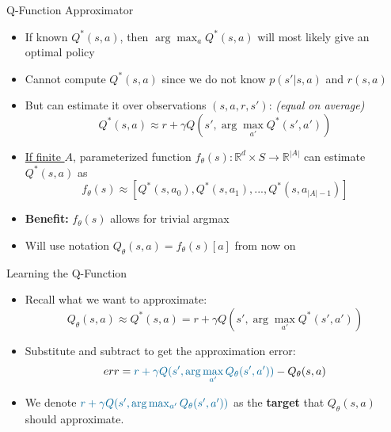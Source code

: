 \documentclass[aspectratio=1609,handout]{beamer}
\newcommand{\tcolorbf}[2]{\textbf{\textcolor{#1}{#2}}}
\newcommand{\mcolor}[2]{\textcolor{#1}{#2}}
\begin{document}
\begin{frame}{Q-Function Approximator}
  \begin{itemize}
  \setlength\itemsep{2mm}
  \item<1-> If known $Q^*(s,a)$, then $\arg\max_a Q^*(s,a)$ will most likely give an optimal policy
  \item<2-> Cannot compute $Q^*(s,a)$ since we do not know $p(s'|s,a)$ and
        $r(s,a)$
  \item<3-> But can estimate it over observations $(s,a,r,s')$:
        \hspace{1mm} {\scriptsize\em (equal on average)}
        \begin{equation}
        Q^*(s,a) \approx r + \gamma Q(s', \arg\max_{a'} Q^*(s', a'))
        \end{equation}
  \item<4-> \underline{If finite $A$}, parameterized function
        $f_\theta(s) : \mathbb{R}^d \times S \rightarrow \mathbb{R}^{|A|}$
        can estimate $Q^*(s,a)$ as
        \begin{equation}
        f_\theta(s) \approx [Q^*(s,a_0), Q^*(s,a_1), ..., Q^*(s,a_{|A|-1})]
        \end{equation}
  \item<5-> \textbf{Benefit:} $f_\theta(s)$ allows for trivial argmax
  \item<6-> Will use notation $Q_\theta(s,a) = f_\theta(s)[a]$ from now on
  \end{itemize}
\end{frame}

\begin{frame}{Learning the Q-Function}
  \begin{itemize}
  \setlength\itemsep{2mm}
  \item<1-> Recall what we want to approximate:
        \begin{equation}
        Q_\theta(s,a) \approx Q^*(s,a) = r + \gamma Q(s', \arg\max_{a'} Q^*(s', a'))
        \end{equation}
  \item<2-> Substitute and subtract to get the approximation error:
        \begin{equation}
        err =
        \mcolor{mathcolor1}{r + \gamma Q(s', \arg\max_{a'} Q_\theta(s', a'))}
        - Q_\theta(s,a)
        \end{equation}
  \item<3-> We denote $\mcolor{mathcolor1}{r + \gamma Q(s', \arg\max_{a'} Q_\theta(s', a'))}$ as the \tcolorbf{mathcolor1}{target} that $Q_\theta(s,a)$ should approximate.
  \end{itemize}
\end{frame}
\end{document}
